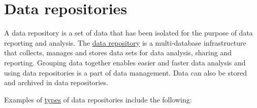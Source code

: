 \documentclass[
]{book}
\begin{document}
\hypertarget{data-repositories}{%
\section{Data repositories}\label{data-repositories}}

A data repository is a set of data that has been isolated for the purpose of data reporting and analysis. The \href{http://digitalguardian.com/blog/what-data-repository}{data repository} is a multi-database infrastructure that collects, manages and stores data sets for data analysis, sharing and reporting. Grouping data together enables easier and faster data analysis and using data repositories is a part of data management. Data can also be stored and archived in data repositories.

Examples of \href{https://stealthbits.com/blog/what-is-a-data-repository-and-what-is-it-used-for/}{types} of data repositories include the following:
\end{document}
